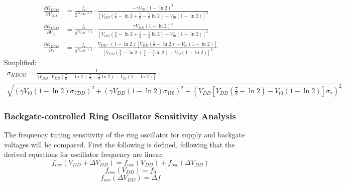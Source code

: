 		\begin{align}
			\frac{\partial K_{DCO}}{\partial V_{DD}} &= \frac{f_c}{2^{N_{DAC}+1}}\cdot\frac{-\gamma V_{t0}(1-\ln2)^2}{\left[ V_{DD}\left(\frac{7}{8}-\ln2+\frac{\gamma}{2}-\frac{\gamma}{2}\ln2\right)-V_{t0}\left(1-\ln2\right) \right]^2}\\
			\frac{\partial K_{DCO}}{\partial V_{t0}} &= \frac{f_c}{2^{N_{DAC}+1}}\cdot\frac{\gamma V_{DD}(1-\ln2)^2}{\left[ V_{DD}\left(\frac{7}{8}-\ln2+\frac{\gamma}{2}-\frac{\gamma}{2}\ln2\right)-V_{t0}\left(1-\ln2\right) \right]^2}\\
			\frac{\partial K_{DCO}}{\partial \gamma} &= \frac{f_c}{2^{N_{DAC}+1}}\cdot\frac{V_{DD}\cdot(1-\ln2) \left[ V_{DD}\left(\frac{7}{8}-\ln2\right)-V_{t0}\left(1-\ln2\right) \right]}{\left[ V_{DD}\left(\frac{7}{8}-\ln2+\frac{\gamma}{2}-\frac{\gamma}{2}\ln2\right)-V_{t0}\left(1-\ln2\right) \right]^2}
		\end{align}
		Simplified:
		\begin{multline}
			\sigma_{KDCO} = \frac{1}{\gamma V_{DD} \left[ V_{DD}\left(\frac{7}{8}-\ln2+\frac{\gamma}{2}-\frac{\gamma}{2}\ln2\right)-V_{t0}\left(1-\ln2\right) \right]}\cdot\\ \sqrt{\left(\gamma V_{t0} (1-\ln2)\sigma_{VDD} \right)^2 + \left(\gamma V_{DD} (1-\ln2)\sigma_{Vt0} \right)^2 + \left( V_{DD}\left[ V_{DD}\left(\frac{7}{8}-\ln2\right)-V_{t0}\left(1-\ln2\right) \right]\sigma_{\gamma} \right)^2 }
		\end{multline}	


		\subsubsection{Backgate-controlled Ring Oscillator Sensitivity Analysis}
		The frequency tuning sensitivity of the ring oscillator for supply and backgate voltages will be compared. First the following is defined, following that the derived equations for oscillator frequency are linear.
		\begin{equation}
			f_{osc}(V_{DD}+\Delta V_{DD}) = f_{osc}(V_{DD}) + f_{osc}(\Delta V_{DD})
		\end{equation}
		\begin{equation}
			f_{osc}(V_{DD}) = f_0
		\end{equation}
		\begin{equation}
			f_{osc}(\Delta V_{DD}) = \Delta f
		\end{equation}

